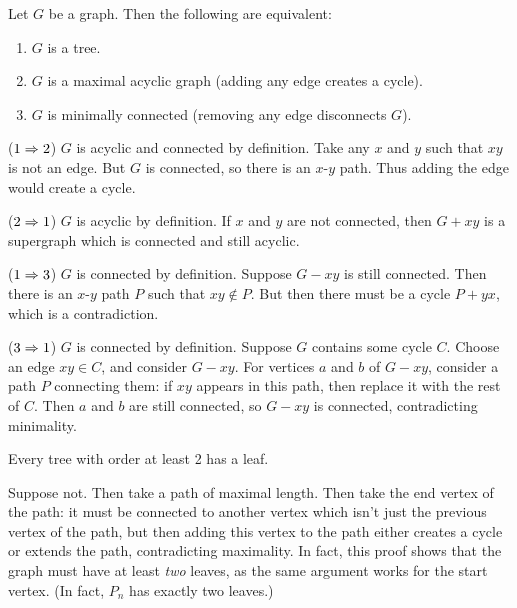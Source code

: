 \documentclass{article}
\begin{document}
\begin{proposition}
	Let $G$ be a graph. Then the following are equivalent:
	\begin{enumerate}
		\item $G$ is a tree.
		\item $G$ is a maximal acyclic graph (adding any edge creates a cycle).
		\item $G$ is minimally connected (removing any edge disconnects $G$).
	\end{enumerate}
\end{proposition}

\begin{prf}
	($1 \Rightarrow 2$) $G$ is acyclic and connected by definition. Take any $x$ and $y$ such that $xy$ is not an edge. But $G$ is connected, so there is an $x$-$y$ path. Thus adding the edge would create a cycle.

	($2 \Rightarrow 1$) $G$ is acyclic by definition. If $x$ and $y$ are not connected, then $G + xy$ is a supergraph which is connected and still acyclic.

	($1 \Rightarrow 3$) $G$ is connected by definition. Suppose $G - xy$ is still connected. Then there is an $x$-$y$ path $P$ such that $xy \notin P$. But then there must be a cycle $P+yx$, which is a contradiction.

	($3 \Rightarrow 1$) $G$ is connected by definition. Suppose $G$ contains some cycle $C$. Choose an edge $xy \in C$, and consider $G - xy$. For vertices $a$ and $b$ of $G - xy$, consider a path $P$ connecting them: if $xy$ appears in this path, then replace it with the rest of $C$. Then $a$ and $b$ are still connected, so $G - xy$ is connected, contradicting minimality.
\end{prf}

\begin{proposition}
	Every tree with order at least 2 has a leaf.
\end{proposition}

\begin{prf}
	Suppose not. Then take a path of maximal length. Then take the end vertex of the path: it must be connected to another vertex which isn't just the previous vertex of the path, but then adding this vertex to the path either creates a cycle or extends the path, contradicting maximality. In fact, this proof shows that the graph must have at least \textit{two} leaves, as the same argument works for the start vertex. (In fact, $P_n$ has exactly two leaves.)
\end{prf}
\end{document}
